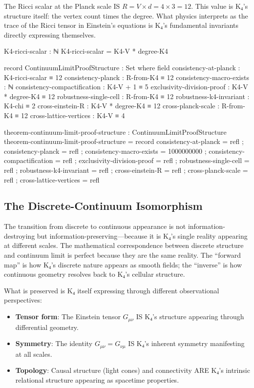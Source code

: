 \documentclass[11pt,a4paper]{book}
\begin{document}
The Ricci scalar at the Planck scale IS $R = V \times d = 4 \times 3 = 12$. This value 
is K₄'s structure itself: the vertex count times the degree. What physics interprets as 
the trace of the Ricci tensor in Einstein's equations is K₄'s fundamental invariants 
directly expressing themselves.

\begin{code}
K4-ricci-scalar : ℕ
K4-ricci-scalar = K4-V * degree-K4

record ContinuumLimitProofStructure : Set where
  field
    consistency-at-planck : K4-ricci-scalar ≡ 12
    consistency-planck : R-from-K4 ≡ 12
    consistency-macro-exists : ℕ
    consistency-compactification : K4-V + 1 ≡ 5
    exclusivity-division-proof : K4-V * degree-K4 ≡ 12
    robustness-single-cell : R-from-K4 ≡ 12
    robustness-k4-invariant : K4-chi ≡ 2
    cross-einstein-R : K4-V * degree-K4 ≡ 12
    cross-planck-scale : R-from-K4 ≡ 12
    cross-lattice-vertices : K4-V ≡ 4

theorem-continuum-limit-proof-structure : ContinuumLimitProofStructure
theorem-continuum-limit-proof-structure = record
  { consistency-at-planck = refl
  ; consistency-planck = refl
  ; consistency-macro-exists = 1000000000
  ; consistency-compactification = refl
  ; exclusivity-division-proof = refl
  ; robustness-single-cell = refl
  ; robustness-k4-invariant = refl
  ; cross-einstein-R = refl
  ; cross-planck-scale = refl
  ; cross-lattice-vertices = refl
  }
\end{code}

\subsection{The Discrete-Continuum Isomorphism}

The transition from discrete to continuous appearance is not information-destroying but 
information-preserving—because it is K₄'s single reality appearing at different scales. 
The mathematical correspondence between discrete structure and continuum limit is perfect 
because they are the same reality. The ``forward map'' is how K₄'s discrete nature appears 
as smooth fields; the ``inverse'' is how continuous geometry resolves back to K₄'s cellular structure.

What is preserved is K₄ itself expressing through different observational perspectives:
\begin{itemize}
\item \textbf{Tensor form}: The Einstein tensor $G_{\mu\nu}$ IS K₄'s structure appearing 
through differential geometry.
\item \textbf{Symmetry}: The identity $G_{\mu\nu} = G_{\nu\mu}$ IS K₄'s inherent symmetry 
manifesting at all scales.
\item \textbf{Topology}: Causal structure (light cones) and connectivity ARE K₄'s intrinsic 
relational structure appearing as spacetime properties.
\end{itemize}
\end{document}
